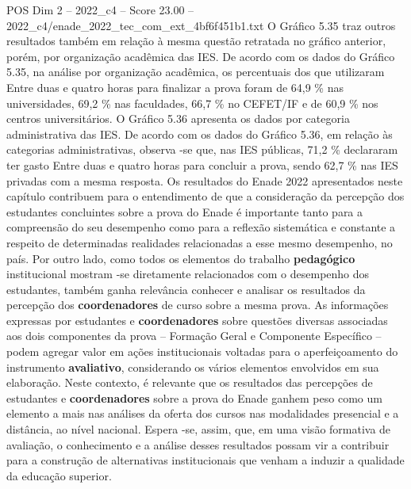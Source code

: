 \begin{textsample}{POS Dim 2 – 2022\_c4 – Score 23.00 – 2022\_c4/enade\_2022\_tec\_com\_ext\_4bf6f451b1.txt}
O Gráfico 5.35 traz outros resultados também em relação à mesma questão retratada no gráfico anterior, porém, por organização acadêmica das IES.
De acordo com os dados do Gráfico 5.35, na análise por organização acadêmica, os percentuais dos que utilizaram Entre duas e quatro horas para finalizar a prova foram de 64,9 \% nas universidades, 69,2 \% nas faculdades, 66,7 \% no CEFET/IF e de 60,9 \% nos centros universitários.
O Gráfico 5.36 apresenta os dados por categoria administrativa das IES.
De acordo com os dados do Gráfico 5.36, em relação às categorias administrativas, observa -se que, nas IES públicas, 71,2 \% declararam ter gasto Entre duas e quatro horas para concluir a prova, sendo 62,7 \% nas IES privadas com a mesma resposta.
Os resultados do Enade 2022 apresentados neste capítulo contribuem para o entendimento de que a consideração da percepção dos estudantes concluintes sobre a prova do Enade é importante tanto para a compreensão do seu desempenho como para a reflexão sistemática e constante a respeito de determinadas realidades relacionadas a esse mesmo desempenho, no país.
Por outro lado, como todos os elementos do trabalho \textbf{pedagógico} institucional mostram -se diretamente relacionados com o desempenho dos estudantes, também ganha relevância conhecer e analisar os resultados da percepção dos \textbf{coordenadores} de curso sobre a mesma prova.
As informações expressas por estudantes e \textbf{coordenadores} sobre questões diversas associadas aos dois componentes da prova – Formação Geral e Componente Específico – podem agregar valor em ações institucionais voltadas para o aperfeiçoamento do instrumento \textbf{avaliativo}, considerando os vários elementos envolvidos em sua elaboração.
Neste contexto, é relevante que os resultados das percepções de estudantes e \textbf{coordenadores} sobre a prova do Enade ganhem peso como um elemento a mais nas análises da oferta dos cursos nas modalidades presencial e a distância, ao nível nacional.
Espera -se, assim, que, em uma visão formativa de avaliação, o conhecimento e a análise desses resultados possam vir a contribuir para a construção de alternativas institucionais que venham a induzir a qualidade da educação superior.

\end{textsample}
